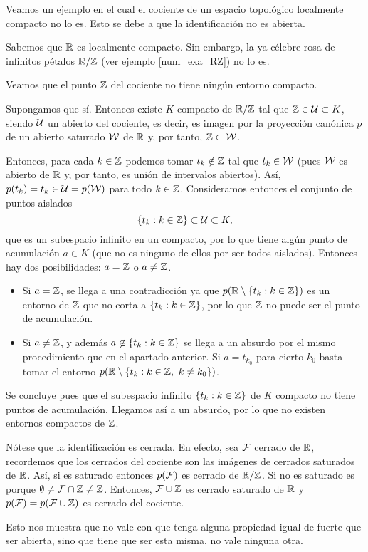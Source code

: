 \begin{exa}\label{comp_exa_RZ}
	Veamos un ejemplo en el cual el cociente de un espacio topológico localmente compacto no lo es. Esto se debe a que la identificación no es abierta.
	
	Sabemos que $\mathbb{R}$ es localmente compacto. Sin embargo, la ya célebre rosa de infinitos pétalos $\mathbb{R}/\mathbb{Z}$ (ver ejemplo \ref{num_exa_RZ}) no lo es.
	
	Veamos que el punto $\mathbb{Z}$ del cociente no tiene ningún entorno compacto.
	
	Supongamos que sí. Entonces existe $K$ compacto de $\mathbb{R}/\mathbb{Z}$ tal que $\mathbb{Z}\in\mathcal{U}\subset K$, siendo $\mathcal{U}$ un abierto del cociente, es decir, es imagen por la proyección canónica $p$ de un abierto saturado $\mathcal{W}$ de $\mathbb{R}$ y, por tanto, $\mathbb{Z}\subset\mathcal{W}$.
	
	Entonces, para cada $k\in\mathbb{Z}$ podemos tomar $t_k\notin\mathbb{Z}$ tal que $t_k\in\mathcal{W}$ (pues $\mathcal{W}$ es abierto de $\mathbb{R}$ y, por tanto, es unión de intervalos abiertos). Así, $p(t_k)=t_k\in\mathcal{U}=p(\mathcal{W})$ para todo $k\in\mathbb{Z}$. Consideramos entonces el conjunto de puntos aislados
	\[\{t_k : k\in\mathbb{Z}\}\subset\mathcal{U}\subset K,\]
	que es un subespacio infinito en un compacto, por lo que tiene algún punto de acumulación $a\in K$ (que no es ninguno de ellos por ser todos aislados). Entonces hay dos posibilidades: $a=\mathbb{Z}$ o $a\not=\mathbb{Z}$.
	\begin{itemize}
		\item Si $a=\mathbb{Z}$, se llega a una contradicción ya que  $p(\mathbb{R}\setminus\{t_k:k\in\mathbb{Z}\})$ es un entorno de $\mathbb{Z}$ que no corta a $\{t_k : k\in\mathbb{Z}\}$, por lo que $\mathbb{Z}$ no puede ser el punto de acumulación.
		\item Si $a\not=\mathbb{Z}$, y además $a\not\in\{t_k : k\in\mathbb{Z}\}$ se llega a un absurdo por el mismo procedimiento que en el apartado anterior. Si $a=t_{k_0}$ para cierto $k_0$ basta tomar el entorno $p(\R\setminus\{t_k:k\in\Z,\ k\not=k_0\})$.
	\end{itemize}
	Se concluye pues que el subespacio infinito $\{t_k : k\in\mathbb{Z}\}$ de $K$ compacto no tiene puntos de acumulación. Llegamos así a un absurdo, por lo que no existen entornos compactos de $\mathbb{Z}$.
	
	Nótese que la identificación es cerrada. En efecto, sea $\mathcal{F}$ cerrado de $\mathbb{R}$, recordemos que los cerrados del cociente son las imágenes de cerrados saturados de $\mathbb{R}$. Así, si es saturado entonces $p(\mathcal{F})$ es cerrado de $\mathbb{R}/\mathbb{Z}$. Si no es saturado es porque $\emptyset\not=\mathcal{F}\cap\mathbb{Z}\not=\mathbb{Z}$. Entonces, $\mathcal{F}\cup\mathbb{Z}$ es cerrado saturado de $\mathbb{R}$ y $p(\mathcal{F})=p(\mathcal{F}\cup\mathbb{Z})$ es cerrado del cociente.
	
	Esto nos muestra que no vale con que tenga alguna propiedad igual de fuerte que ser abierta, sino que tiene que ser esta misma, no vale ninguna otra.
\end{exa}

